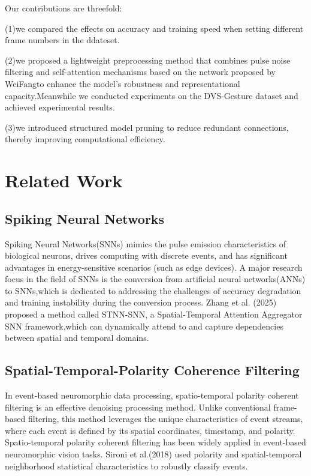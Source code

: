 \documentclass[conference]{IEEEtran}
\begin{document}
Our contributions are threefold:

(1)we compared the effects on accuracy and training speed when setting different frame numbers in the ddateset.

(2)we proposed a lightweight preprocessing method that combines pulse noise filtering and self-attention mechanisms based on the network proposed by WeiFang\cite{fang2021}to enhance the model's robustness and representational capacity.Meanwhile we conducted experiments on the DVS-Gesture dataset and achieved experimental results.

(3)we introduced structured model pruning to reduce redundant connections, thereby improving computational efficiency.


\section{Related Work}
\subsection{Spiking Neural Networks}
Spiking Neural Networks(SNNs) mimics the pulse emission characteristics of biological neurons, drives computing with discrete events, and has significant advantages in energy-sensitive scenarios (such as edge devices)\cite{roy2019towards}. A major research focus in the field of SNNs is the conversion from artificial neural networks(ANNs) to SNNs\cite{rueckauer2017conversion},which is dedicated to addressing the challenges of accuracy degradation and training instability during the conversion process\cite{han2020rmp}. Zhang et al. (2025) proposed a method called STNN-SNN, a Spatial-Temporal Attention Aggregator SNN framework,which can dynamically attend to and capture dependencies between spatial and temporal domains\cite{zhang2025}.

\subsection{Spatial-Temporal-Polarity Coherence Filtering}
In event-based neuromorphic data processing, spatio-temporal polarity coherent filtering is an effective denoising processing method. Unlike conventional frame-based filtering, this method leverages the unique characteristics of event streams, where each event is defined by its spatial coordinates, timestamp, and polarity. Spatio-temporal polarity coherent filtering has been widely applied in event-based neuromorphic vision tasks. Sironi et al.(2018) used polarity and spatial-temporal neighborhood statistical characteristics to robustly classify events\cite{8578284}. 
\end{document}
